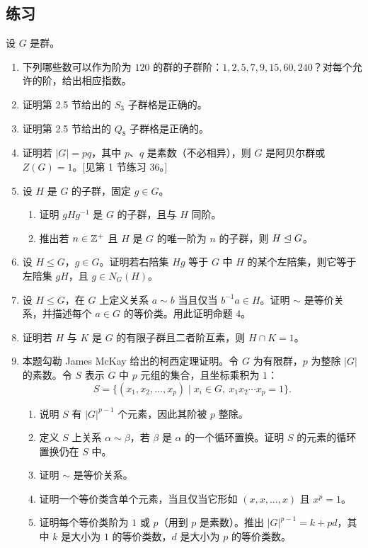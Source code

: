 \subsection*{练习}
设 $G$ 是群。
\begin{enumerate}[label=\arabic*.]
  \item 下列哪些数可以作为阶为 $120$ 的群的子群阶：$1,2,5,7,9,15,60,240$？对每个允许的阶，给出相应指数。
  \item 证明第 2.5 节给出的 $S_3$ 子群格是正确的。
  \item 证明第 2.5 节给出的 $Q_8$ 子群格是正确的。
  \item 证明若 $|G|=pq$，其中 $p$、$q$ 是素数（不必相异），则 $G$ 是阿贝尔群或 $Z(G)=1$。[见第 1 节练习 36。]
  \item 设 $H$ 是 $G$ 的子群，固定 $g\in G$。
  \begin{enumerate}[label=(\alph*)]
    \item 证明 $gHg^{-1}$ 是 $G$ 的子群，且与 $H$ 同阶。
    \item 推出若 $n\in\mathbb{Z}^+$ 且 $H$ 是 $G$ 的唯一阶为 $n$ 的子群，则 $H\trianglelefteq G$。
  \end{enumerate}
  \item 设 $H\leq G$，$g\in G$。证明若右陪集 $Hg$ 等于 $G$ 中 $H$ 的某个左陪集，则它等于左陪集 $gH$，且 $g\in N_G(H)$。
  \item 设 $H\leq G$，在 $G$ 上定义关系 $a\sim b$ 当且仅当 $b^{-1}a\in H$。证明 $\sim$ 是等价关系，并描述每个 $a\in G$ 的等价类。用此证明命题 4。
  \item 证明若 $H$ 与 $K$ 是 $G$ 的有限子群且二者阶互素，则 $H\cap K=1$。
  \item 本题勾勒 James McKay 给出的柯西定理证明。令 $G$ 为有限群，$p$ 为整除 $|G|$ 的素数。令 $S$ 表示 $G$ 中 $p$ 元组的集合，且坐标乘积为 $1$：
  \[
    S=\{(x_1,x_2,
    \ldots,x_p)\mid x_i\in G,
    \ x_1x_2\cdots x_p=1\}.
  \]
  \begin{enumerate}[label=(\alph*)]
    \item 说明 $S$ 有 $|G|^{p-1}$ 个元素，因此其阶被 $p$ 整除。
    \item 定义 $S$ 上关系 $\alpha\sim\beta$，若 $\beta$ 是 $\alpha$ 的一个循环置换。证明 $S$ 的元素的循环置换仍在 $S$ 中。
    \item 证明 $\sim$ 是等价关系。
    \item 证明一个等价类含单个元素，当且仅当它形如 $(x,x,
    \ldots,x)$ 且 $x^p=1$。
    \item 证明每个等价类阶为 $1$ 或 $p$（用到 $p$ 是素数）。推出 $|G|^{p-1}=k+pd$，其中 $k$ 是大小为 $1$ 的等价类数，$d$ 是大小为 $p$ 的等价类数。

\end{enumerate}
\end{enumerate}
